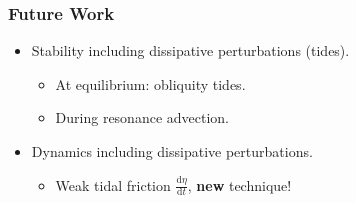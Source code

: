\documentclass[dvipsnames]{beamer}
\newcommand*{\rd}[2]{\frac{\mathrm{d}#1}{\mathrm{d}#2}}
\begin{document}
\begin{frame}
    \frametitle{Future Work}

    \begin{itemize}
        \item Stability including dissipative perturbations (tides).
            \begin{itemize}
                \item At equilibrium: obliquity tides.
                \item During resonance advection.
            \end{itemize}

        \item Dynamics including dissipative perturbations.
            \begin{itemize}
                \item Weak tidal friction $\rd{\eta}{t}$, \textbf{new}
                    technique!
            \end{itemize}
    \end{itemize}
\end{frame}
\end{document}
